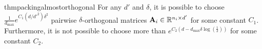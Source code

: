 \documentclass{article} %
\theoremstyle{plain}
\theoremstyle{definition}
\begin{document}

\begin{restatable}{thm}{packingalmostorthogonal}
    \label{thm:packing_almost_ortho}
    For any $d'$ and $\delta$, it is possible to choose $\frac{1}{d_{\max}}e^{C_1 (d / d'^2) \delta^2}$ pairwise $\delta$-orthogonal matrices ${\mathbf A}_i \in \mathbb{R}^{n_i \times d'}$ for some constant $C_1$. Furthermore, it is not possible to choose more than $e^{C_2(d - d_{\max}\delta \log(\frac{1}{\delta}))}$ for some constant $C_2$.
\end{restatable}



\end{document}
